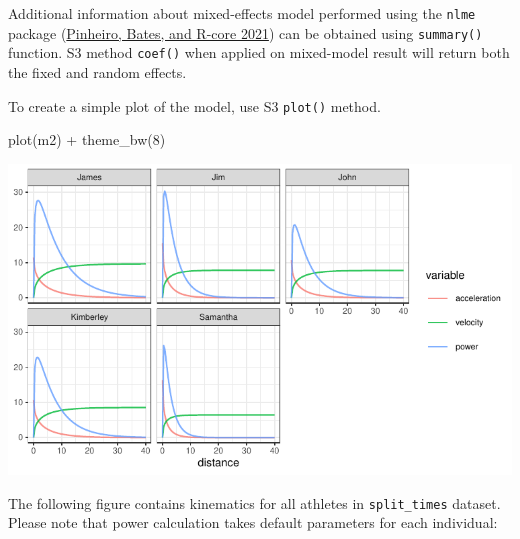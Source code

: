 \documentclass[fleqn,10pt]{wlpeerj} %
\newenvironment{Shaded}{\begin{snugshade}}{\end{snugshade}}
\newcommand{\DecValTok}[1]{\textcolor[rgb]{0.00,0.00,0.81}{#1}}
\newcommand{\FunctionTok}[1]{\textcolor[rgb]{0.00,0.00,0.00}{#1}}
\newcommand{\NormalTok}[1]{#1}
\newcommand{\SpecialCharTok}[1]{\textcolor[rgb]{0.00,0.00,0.00}{#1}}
\begin{document}
\normalsize

Additional information about mixed-effects model performed using the \texttt{nlme} package (\protect\hyperlink{ref-R-nlme}{Pinheiro, Bates, and R-core 2021}) can be obtained using \texttt{summary()} function. S3 method \texttt{coef()} when applied on mixed-model result will return both the fixed and random effects.

To create a simple plot of the model, use S3 \texttt{plot()} method.

\small

\begin{Shaded}
\begin{Highlighting}[]
\FunctionTok{plot}\NormalTok{(m2) }\SpecialCharTok{+} \FunctionTok{theme\_bw}\NormalTok{(}\DecValTok{8}\NormalTok{)}
\end{Highlighting}
\end{Shaded}

\begin{center}\includegraphics[width=0.9\linewidth]{paper_files/figure-latex/unnamed-chunk-11-1} \end{center}

\normalsize

The following figure contains kinematics for all athletes in \texttt{split\_times} dataset. Please note that power calculation takes default parameters for each individual:

\small
\end{document}
